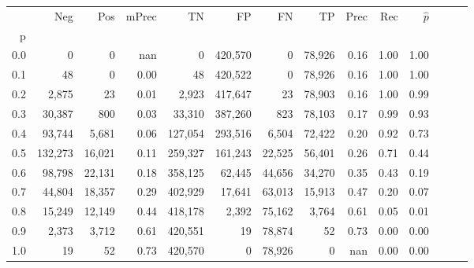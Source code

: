 \begin{tabular}{rrrrrrrrrrrrrr}
\toprule
{} &      Neg &     Pos & mPrec &       TN &       FP &      FN &      TP &  Prec &   Rec & $\hat{p}$ \\
p   &          &         &       &          &          &         &         &       &       &           \\
\midrule
0.0 &        0 &       0 &   nan &        0 &  420,570 &       0 &  78,926 &  0.16 &  1.00 &      1.00 \\
0.1 &       48 &       0 &  0.00 &       48 &  420,522 &       0 &  78,926 &  0.16 &  1.00 &      1.00 \\
0.2 &    2,875 &      23 &  0.01 &    2,923 &  417,647 &      23 &  78,903 &  0.16 &  1.00 &      0.99 \\
0.3 &   30,387 &     800 &  0.03 &   33,310 &  387,260 &     823 &  78,103 &  0.17 &  0.99 &      0.93 \\
0.4 &   93,744 &   5,681 &  0.06 &  127,054 &  293,516 &   6,504 &  72,422 &  0.20 &  0.92 &      0.73 \\
0.5 &  132,273 &  16,021 &  0.11 &  259,327 &  161,243 &  22,525 &  56,401 &  0.26 &  0.71 &      0.44 \\
0.6 &   98,798 &  22,131 &  0.18 &  358,125 &   62,445 &  44,656 &  34,270 &  0.35 &  0.43 &      0.19 \\
0.7 &   44,804 &  18,357 &  0.29 &  402,929 &   17,641 &  63,013 &  15,913 &  0.47 &  0.20 &      0.07 \\
0.8 &   15,249 &  12,149 &  0.44 &  418,178 &    2,392 &  75,162 &   3,764 &  0.61 &  0.05 &      0.01 \\
0.9 &    2,373 &   3,712 &  0.61 &  420,551 &       19 &  78,874 &      52 &  0.73 &  0.00 &      0.00 \\
1.0 &       19 &      52 &  0.73 &  420,570 &        0 &  78,926 &       0 &   nan &  0.00 &      0.00 \\
\bottomrule
\end{tabular}

